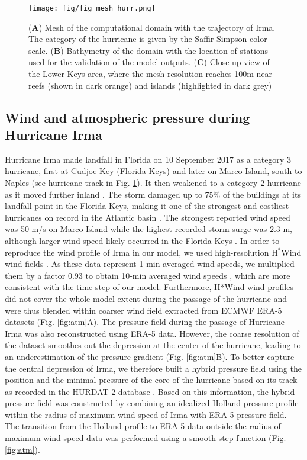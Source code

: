 \documentclass[preprint,12pt,authoryear]{elsarticle}
\begin{document}
\begin{figure}
    \centering
    \texttt{[image: fig/fig\_mesh\_hurr.png]}
    \caption{(\textbf{A}) Mesh of the computational domain with the trajectory of Irma. The category of the hurricane is given by the Saffir-Simpson color scale. (\textbf{B}) Bathymetry of the domain with the location of stations used for the validation of the model outputs. (\textbf{C}) Close up view of the Lower Keys area, where the mesh resolution reaches 100m near reefs (shown in dark orange) and islands (highlighted in dark grey)}
    \label{fig:mesh}
\end{figure}

\subsection{Wind and atmospheric pressure during Hurricane Irma}

Hurricane Irma made landfall in Florida on 10 September 2017 as a category 3 hurricane, first at Cudjoe Key (Florida Keys) and later on Marco Island, south to Naples (see hurricane track in Fig. \ref{fig:mesh}). It then weakened to a category 2 hurricane as it moved further inland \citep{pinelli2018overview}. The storm damaged up to 75\% of the buildings at its landfall point in the Florida Keys, making it one of the strongest and costliest hurricanes on record in the Atlantic basin \citep{xian2018brief,zhang2019modeling}. The strongest reported wind speed was 50 m/s on Marco Island while the highest recorded storm surge was 2.3 m, although larger wind speed likely occurred in the Florida Keys \citep{pinelli2018overview}. In order to reproduce the wind profile of Irma in our model, we used high-resolution H$^\ast$Wind wind fields \citep{powell1998hrd}. As these data represent 1-min averaged wind speeds, we multiplied them by a factor 0.93 to obtain 10-min averaged wind speeds \citep{harper2010guidelines}, which are more consistent with the time step of our model. Furthermore, H*Wind wind profiles did not cover the whole model extent during the passage of the hurricane and were thus blended within coarser wind field extracted from ECMWF ERA-5 datasets (Fig. \ref{fig:atm}A). The pressure field during the passage of Hurricane Irma was also reconstructed using ERA-5 data. However, the coarse resolution of the dataset smoothes out the depression at the center of the hurricane, leading to an underestimation of the pressure gradient (Fig. \ref{fig:atm}B). To better capture the central depression of Irma, we therefore built a hybrid pressure field using the position and the minimal pressure of the core of the hurricane based on its track as recorded in the HURDAT 2 database \citep{landsea2013atlantic}. Based on this information, the hybrid pressure field was constructed by combining an idealized Holland pressure profile \citep{lin2012hurricane} within the radius of maximum wind speed of Irma \citep{knaff2018statistical} with ERA-5 pressure field. The transition from the Holland profile to ERA-5 data outside the radius of maximum wind speed data was performed using a smooth step function (Fig. \ref{fig:atm}).
\end{document}
